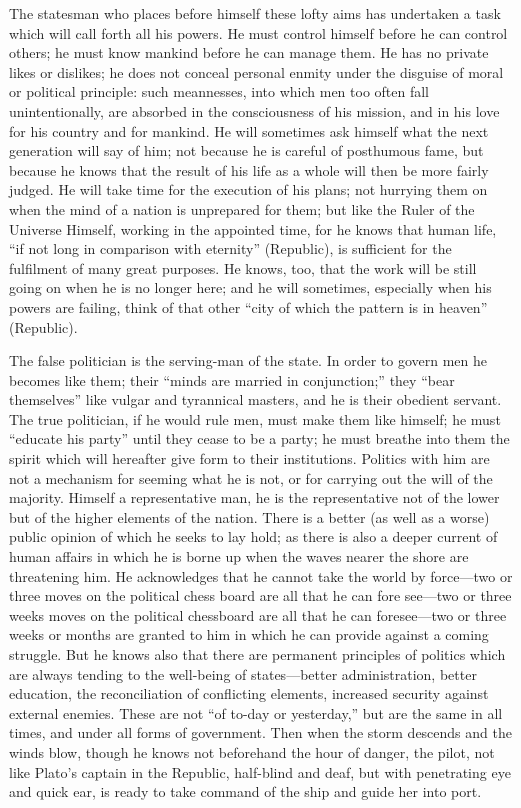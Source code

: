 \documentclass[11pt,letter]{article}
\begin{document}
\par  The statesman who places before himself these lofty aims has undertaken a task which will call forth all his powers. He must control himself before he can control others; he must know mankind before he can manage them. He has no private likes or dislikes; he does not conceal personal enmity under the disguise of moral or political principle: such meannesses, into which men too often fall unintentionally, are absorbed in the consciousness of his mission, and in his love for his country and for mankind. He will sometimes ask himself what the next generation will say of him; not because he is careful of posthumous fame, but because he knows that the result of his life as a whole will then be more fairly judged. He will take time for the execution of his plans; not hurrying them on when the mind of a nation is unprepared for them; but like the Ruler of the Universe Himself, working in the appointed time, for he knows that human life, “if not long in comparison with eternity” (Republic), is sufficient for the fulfilment of many great purposes. He knows, too, that the work will be still going on when he is no longer here; and he will sometimes, especially when his powers are failing, think of that other “city of which the pattern is in heaven” (Republic).

\par  The false politician is the serving-man of the state. In order to govern men he becomes like them; their “minds are married in conjunction;” they “bear themselves” like vulgar and tyrannical masters, and he is their obedient servant. The true politician, if he would rule men, must make them like himself; he must “educate his party” until they cease to be a party; he must breathe into them the spirit which will hereafter give form to their institutions. Politics with him are not a mechanism for seeming what he is not, or for carrying out the will of the majority. Himself a representative man, he is the representative not of the lower but of the higher elements of the nation. There is a better (as well as a worse) public opinion of which he seeks to lay hold; as there is also a deeper current of human affairs in which he is borne up when the waves nearer the shore are threatening him. He acknowledges that he cannot take the world by force—two or three moves on the political chess board are all that he can fore see—two or three weeks moves on the political chessboard are all that he can foresee—two or three weeks or months are granted to him in which he can provide against a coming struggle. But he knows also that there are permanent principles of politics which are always tending to the well-being of states—better administration, better education, the reconciliation of conflicting elements, increased security against external enemies. These are not “of to-day or yesterday,” but are the same in all times, and under all forms of government. Then when the storm descends and the winds blow, though he knows not beforehand the hour of danger, the pilot, not like Plato’s captain in the Republic, half-blind and deaf, but with penetrating eye and quick ear, is ready to take command of the ship and guide her into port.
\end{document}
